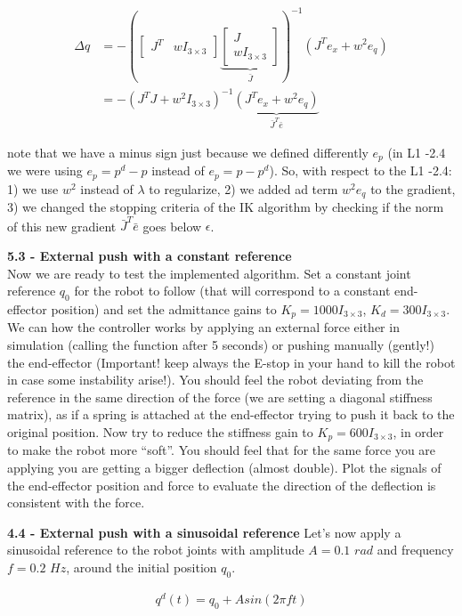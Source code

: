 \documentclass[11pt]{article}
\newcommand{\mat}[1]{\ensuremath{\begin{bmatrix}#1\end{bmatrix}}}	%
\begin{document}
\begin{align*}
\Delta q &= -\left( \mat { J^T &  wI_{3 \times 3} } \underbrace{ \mat{J  \\ wI_{3 \times 3}}}_{\bar{J}} \right)^{-1} \left(J^T e_x + w^2e_q \right) \\
	    &= -\left( J^TJ + w^2I_{3 \times 3}\right)^{-1} \underbrace{ \left(J^T e_x + w^2 e_q \right) }_{\bar{J}^T\bar{e}}
\end{align*}

note that we have a minus sign just because we defined differently $e_p$ (in L1 -2.4 we were using $e_p = p^d- p$ instead of $e_p = p - p^d$). So, with respect to the L1 -2.4: 1) we use $w^2$ instead of $\lambda $ to regularize, 2) we added ad term $w^2 e_q $ to the gradient, 3) we changed the stopping criteria of the IK algorithm by checking if the norm of this new gradient $\bar{J}^T\bar{e}$ goes below $\epsilon$.


\quad

\noindent
\textbf{5.3 - External push with a constant reference}\\
Now we are ready to test the implemented algorithm. Set  a constant joint reference $q_0$  for the robot to follow (that will correspond to a constant end-effector position) and set the admittance gains to $K_p = 1000I_{3\times3}$,  $K_d = 300I_{3\times3}$. We can how the controller works by applying an external force either in simulation (calling the function  after 5 seconds) or pushing manually (gently!) the end-effector (Important! keep always the E-stop in your hand to kill the robot in case some instability arise!). You should feel the robot deviating from the reference in the same direction of the force (we are setting a diagonal stiffness matrix), as if a spring is attached at the end-effector trying to push it back to the original position. 
Now try to reduce the stiffness gain to $K_p = 600I_{3\times3}$, in order to make the robot more ``soft''. You should feel that for the same force you are applying you are getting a bigger deflection (almost double).
Plot the signals of the end-effector position and force to evaluate the direction of the deflection is consistent with the force.

\textbf{4.4 - External push with a sinusoidal reference}
Let's now apply a sinusoidal reference to the robot joints  with amplitude $A= 0.1$ $rad$ and frequency $f = 0.2$ $Hz$, around the initial position $q_0$.

\begin{align*}
q^d(t) = q_0 + Asin(2\pi f t )
\end{align*} 
\end{document}
